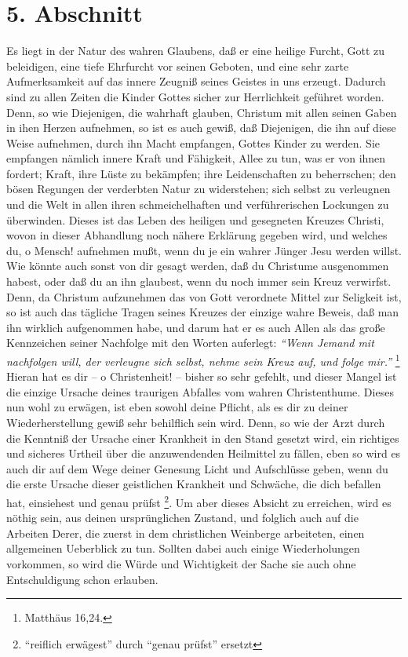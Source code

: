 \section{5. Abschnitt}  \label{kap2_ab5}

Es liegt in der Natur des wahren Glaubens, daß er eine heilige Furcht, Gott zu
beleidigen, eine tiefe Ehrfurcht vor seinen Geboten, und eine sehr zarte
Aufmerksamkeit auf das innere Zeugniß seines Geistes in uns erzeugt. Dadurch
sind zu allen Zeiten die Kinder Gottes sicher zur Herrlichkeit geführet worden.
Denn, so wie Diejenigen, die wahrhaft glauben, Christum mit allen seinen Gaben
in ihen Herzen aufnehmen, so ist es auch gewiß, daß Diejenigen, die ihn auf
diese Weise aufnehmen, durch ihn Macht empfangen, Gottes Kinder zu werden. Sie
empfangen nämlich innere Kraft und Fähigkeit, Allee zu tun, was er von ihnen
fordert; Kraft, ihre Lüste zu bekämpfen; ihre Leidenschaften zu beherrschen; den
bösen Regungen der verderbten Natur zu widerstehen; sich selbst zu verleugnen
und die Welt in allen ihren schmeichelhaften und verführerischen Lockungen zu
überwinden. Dieses ist das Leben des heiligen und gesegneten Kreuzes Christi,
wovon in dieser Abhandlung noch nähere Erklärung gegeben wird, und welches du, o
Mensch! aufnehmen mußt, wenn du je ein wahrer Jünger Jesu werden willst. Wie
könnte auch sonst von dir gesagt werden, daß du Christume ausgenommen habest,
oder daß du an ihn glaubest, wenn du noch immer sein Kreuz verwirfst. Denn, da
Christum aufzunehmen das von Gott verordnete Mittel zur Seligkeit ist, so ist
auch das tägliche Tragen seines Kreuzes der einzige wahre Beweis, daß man ihn
wirklich aufgenommen habe, und darum hat er es auch Allen als das große
Kennzeichen seiner Nachfolge mit den Worten auferlegt:
\textit{"`Wenn Jemand mit nachfolgen will, der verleugne sich selbst, nehme sein
Kreuz auf, und folge mir."'}
\footnote{Matthäus 16,24.}
Hieran hat es dir -- o Christenheit! -- bisher so sehr gefehlt, und dieser
Mangel ist
die einzige Ursache deines traurigen Abfalles vom wahren Christenthume. Dieses
nun wohl zu erwägen, ist eben sowohl deine Pflicht, als es dir zu deiner
Wiederherstellung gewiß sehr behilflich sein wird. Denn, so wie der Arzt durch
die Kenntniß der Ursache einer Krankheit in den Stand gesetzt wird, ein
richtiges und sicheres Urtheil über die anzuwendenden Heilmittel zu fällen, eben
so wird es auch dir auf dem Wege deiner Genesung Licht und Aufschlüsse geben,
wenn du die erste Ursache dieser geistlichen Krankheit und Schwäche, die dich
befallen hat, einsiehest und genau prüfst \footnote{"`reiflich erwägest"' durch
"`genau prüfst"' ersetzt}. Um aber dieses Absicht zu
erreichen, wird es nöthig sein, aus deinen ursprünglichen Zustand, und folglich
auch auf die Arbeiten Derer, die zuerst in dem christlichen Weinberge
arbeiteten, einen allgemeinen Ueberblick zu tun. Sollten dabei auch einige
Wiederholungen vorkommen, so wird die Würde und Wichtigkeit der Sache sie auch
ohne Entschuldigung schon erlauben.

